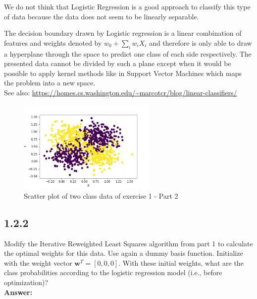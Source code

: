 \documentclass[a4paper]{article}
\begin{document}
\vspace{1em}

We do not think that Logistic Regression is a good approach to classify this type of data because the data does not seem to be linearly separable.

The decision boundary drawn by Logistic regression is a linear combination of features and weights denoted by $w_0 + \sum_i w_iX_i$ and therefore is only able to draw a hyperplane through the space to predict one class of each side respectively. The presented data cannot be divided by such a plane except when it would be possible to apply kernel methods like in Support Vector Machines which maps the problem into a new space.\\

See also: \url{https://homes.cs.washington.edu/~marcotcr/blog/linear-classifiers/}


\begin{figure}[H]
\center
\includegraphics[width=0.6\textwidth]{Images/figure_1_2_1.png}
\caption{Scatter plot of two class data of exercise 1 - Part 2}
\label{Fig:1_2_1}
\end{figure}





\subsection*{1.2.2}

Modify the Iterative Reweighted Least Squares algorithm from part 1 to calculate the optimal weights for this data. Use again a dummy basis function. Initialize with the weight vector $\textbf{w}^T = [0, 0, 0]$. With these initial weights, what are the class probabilities according to the logistic regression model (i.e., before optimization)?\\

\textbf{Answer:}\\
\end{document}
